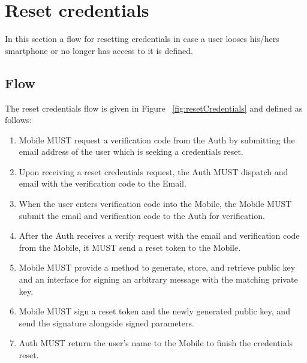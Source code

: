 \section{Reset credentials}
In this section a flow for resetting credentials in case a user looses his/hers
smartphone or no longer has access to it is defined. 

    \subsection{Flow}
    The reset credentials flow is given in Figure ~\ref{fig:resetCredentials} and defined as follows:
        \begin{enumerate}
            \item Mobile MUST request a verification code from the Auth by submitting the email address of the user
                  which is seeking a credentials reset.
            \item Upon receiving a reset credentials request, the Auth MUST dispatch and email with the verification
                  code to the Email.
            \item When the user enters verification code into the Mobile, the Mobile MUST submit the email and 
                  verification code to the Auth for verification. 
            \item After the Auth receives a verify request with the email and verification code from the Mobile, it 
                  MUST send a reset token to the Mobile. 
            \item Mobile  MUST  provide  a  method  to  generate,  store,  and  retrieve public key and an interface 
                  for signing an arbitrary message with the matching private key.
            \item Mobile MUST sign a reset token and the newly generated public key, and send the signature alongside
                  signed parameters.
            \item Auth MUST return the user's name to the Mobile to finish the credentials reset.
        \end{enumerate}
        
